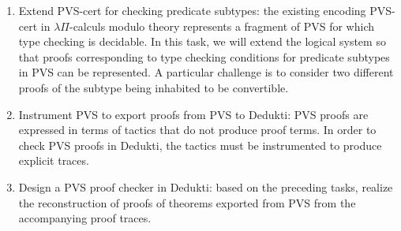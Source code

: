 \begin{enumerate}
\item Extend PVS-cert for checking predicate subtypes: the existing encoding
  PVS-cert in $\lambda\Pi$-calculs modulo theory represents a fragment of PVS
  for which type checking is decidable. In this task, we will extend the logical
  system so that proofs corresponding to type checking conditions for predicate
  subtypes in PVS can be represented. A particular challenge is to consider two
  different proofs of the subtype being inhabited to be convertible.
\item Instrument PVS to export proofs from PVS to Dedukti: PVS proofs are
  expressed in terms of tactics that do not produce proof terms. In order to
  check PVS proofs in Dedukti, the tactics must be instrumented to produce
  explicit traces.
\item Design a PVS proof checker in Dedukti: based on the preceding tasks,
  realize the reconstruction of proofs of theorems exported from PVS from the
  accompanying proof traces.
\end{enumerate}

